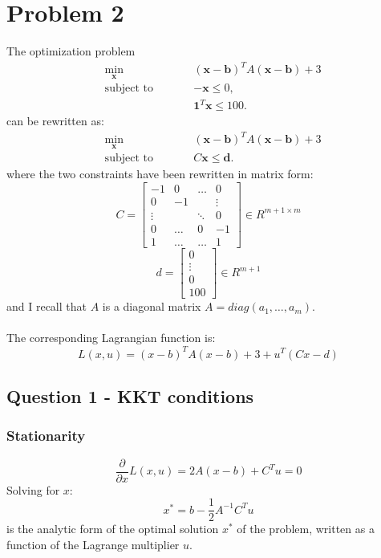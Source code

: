 \documentclass[]{article}
\begin{document}
\section*{Problem 2}
The optimization problem
\begin{subequations}
	\begin{alignat*}{2}
		&\!\min_{\mathbf{x}}        &\qquad& (\mathbf{x}-\mathbf{b})^TA(\mathbf{x}-\mathbf{b})+3\\
		&\text{subject to} &      & -\mathbf{x}\leq0,\\
		&                  &      & \mathbf{1}^T\mathbf{x} \leq 100.
	\end{alignat*}
\end{subequations}
can be rewritten as:
\begin{subequations}
	\begin{alignat*}{2}
		&\!\min_{\mathbf{x}}        &\qquad& (\mathbf{x}-\mathbf{b})^TA(\mathbf{x}-\mathbf{b})+3\\
		&\text{subject to} &      & C\mathbf{x}\leq \mathbf{d}.
	\end{alignat*}
\end{subequations}
where the two constraints have been rewritten in matrix form:
\[
C = \begin{bmatrix} 
	-1 & 0 & \dots  & 0\\
	0 & -1 &  & \vdots\\
	\vdots & & \ddots & 0\\
	0 & \dots & 0 & -1\\
	1 &  \dots & \dots     & 1 
\end{bmatrix}
\in R^{m+1 \times m}\] 
\[
d = \begin{bmatrix} 
	0 \\
	\vdots \\
	0\\
	100  
\end{bmatrix}
\in R^{m+1}
\]
and I recall that $A$ is a diagonal matrix $A=diag(a_1,\dots,a_m)$.\\\\
The corresponding Lagrangian function is:
\[
L(x,u) = (x-b)^TA(x-b)+3 + u^T(Cx-d)
\]
\subsection*{Question 1 - KKT conditions}
\subsubsection*{Stationarity}
\begin{equation}
	\label{stationarity}
	\frac{\partial}{\partial x}L(x,u) = 2A(x-b)+C^Tu = 0
\end{equation}
Solving for $x$:
\[
x^* = b-\frac{1}{2}A^{-1}C^Tu
\]
is the analytic form of the optimal solution $x^*$ of the problem, written as a function of the Lagrange multiplier $u$.
\end{document}
